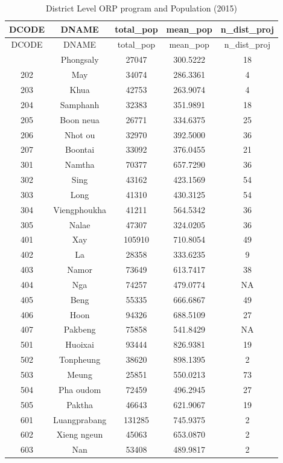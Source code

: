 \documentclass[
  letterpaper,
  DIV=11,
  numbers=noendperiod]{scrartcl}
\begin{document}
\begin{longtable}[]{@{}ccccc@{}}
\caption{District Level ORP program and Population
(2015)}\tabularnewline
\toprule\noalign{}
DCODE & DNAME & total\_pop & mean\_pop & n\_dist\_proj \\
\midrule\noalign{}
\endfirsthead
\toprule\noalign{}
DCODE & DNAME & total\_pop & mean\_pop & n\_dist\_proj \\
\midrule\noalign{}
\endhead
\bottomrule\noalign{}
\endlastfoot
201 & Phongsaly & 27047 & 300.5222 & 18 \\
202 & May & 34074 & 286.3361 & 4 \\
203 & Khua & 42753 & 263.9074 & 4 \\
204 & Samphanh & 32383 & 351.9891 & 18 \\
205 & Boon neua & 26771 & 334.6375 & 25 \\
206 & Nhot ou & 32970 & 392.5000 & 36 \\
207 & Boontai & 33092 & 376.0455 & 21 \\
301 & Namtha & 70377 & 657.7290 & 36 \\
302 & Sing & 43162 & 423.1569 & 54 \\
303 & Long & 41310 & 430.3125 & 54 \\
304 & Viengphoukha & 41211 & 564.5342 & 36 \\
305 & Nalae & 47307 & 324.0205 & 36 \\
401 & Xay & 105910 & 710.8054 & 49 \\
402 & La & 28358 & 333.6235 & 9 \\
403 & Namor & 73649 & 613.7417 & 38 \\
404 & Nga & 74257 & 479.0774 & NA \\
405 & Beng & 55335 & 666.6867 & 49 \\
406 & Hoon & 94326 & 688.5109 & 27 \\
407 & Pakbeng & 75858 & 541.8429 & NA \\
501 & Huoixai & 93444 & 826.9381 & 19 \\
502 & Tonpheung & 38620 & 898.1395 & 2 \\
503 & Meung & 25851 & 550.0213 & 73 \\
504 & Pha oudom & 72459 & 496.2945 & 27 \\
505 & Paktha & 46643 & 621.9067 & 19 \\
601 & Luangprabang & 131285 & 745.9375 & 2 \\
602 & Xieng ngeun & 45063 & 653.0870 & 2 \\
603 & Nan & 53408 & 489.9817 & 2 \\

\end{longtable}
\end{document}
